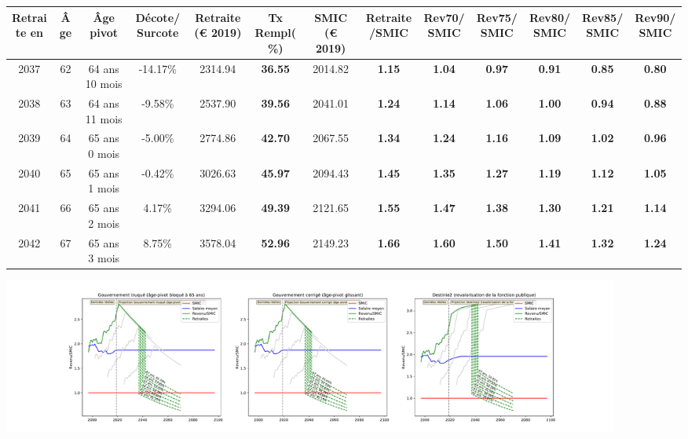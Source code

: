 { \scriptsize \begin{center} 
\begin{tabular}[htb]{|c|c||c|c||c|c||c||c|c|c|c|c|c|} 
\hline 
 Retraite en &  Âge &  Âge pivot &  Décote/Surcote &  Retraite (\euro{} 2019) &  Tx Rempl(\%) &  SMIC (\euro{} 2019) &  Retraite/SMIC &  Rev70/SMIC &  Rev75/SMIC &  Rev80/SMIC &  Rev85/SMIC &  Rev90/SMIC \\ 
\hline \hline 
 2037 &  62 &  64 ans 10 mois &  -14.17\% &  2314.94 &  {\bf 36.55} &  2014.82 &  {\bf 1.15} &  {\bf 1.04} &  {\bf {\color{red} 0.97}} &  {\bf {\color{red} 0.91}} &  {\bf {\color{red} 0.85}} &  {\bf {\color{red} 0.80}} \\ 
\hline 
 2038 &  63 &  64 ans 11 mois &  -9.58\% &  2537.90 &  {\bf 39.56} &  2041.01 &  {\bf 1.24} &  {\bf 1.14} &  {\bf 1.06} &  {\bf {\color{red} 1.00}} &  {\bf {\color{red} 0.94}} &  {\bf {\color{red} 0.88}} \\ 
\hline 
 2039 &  64 &  65 ans 0 mois &  -5.00\% &  2774.86 &  {\bf 42.70} &  2067.55 &  {\bf 1.34} &  {\bf 1.24} &  {\bf 1.16} &  {\bf 1.09} &  {\bf 1.02} &  {\bf {\color{red} 0.96}} \\ 
\hline 
 2040 &  65 &  65 ans 1 mois &  -0.42\% &  3026.63 &  {\bf 45.97} &  2094.43 &  {\bf 1.45} &  {\bf 1.35} &  {\bf 1.27} &  {\bf 1.19} &  {\bf 1.12} &  {\bf 1.05} \\ 
\hline 
 2041 &  66 &  65 ans 2 mois &  4.17\% &  3294.06 &  {\bf 49.39} &  2121.65 &  {\bf 1.55} &  {\bf 1.47} &  {\bf 1.38} &  {\bf 1.30} &  {\bf 1.21} &  {\bf 1.14} \\ 
\hline 
 2042 &  67 &  65 ans 3 mois &  8.75\% &  3578.04 &  {\bf 52.96} &  2149.23 &  {\bf 1.66} &  {\bf 1.60} &  {\bf 1.50} &  {\bf 1.41} &  {\bf 1.32} &  {\bf 1.24} \\ 
\hline 
\hline 
\end{tabular} 
\end{center} } 

 \begin{center}\includegraphics[width=0.9\textwidth]{fig/ProfAgrege_1975_22_dest_retraite.pdf}\end{center} \label{fig/ProfAgrege_1975_22_dest_retraite.pdf} 


